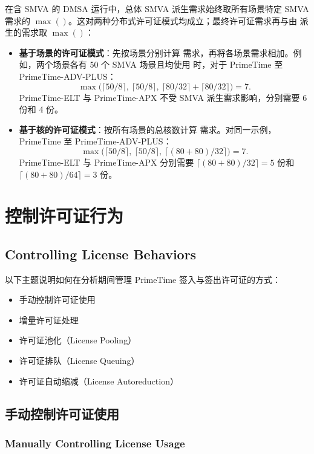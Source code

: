 在含 SMVA 的 DMSA 运行中，总体 SMVA 派生需求始终取所有场景特定
SMVA 需求的 $\max()$。这对两种分布式许可证模式均成立；最终许可证需求再与由  派生的需求取 $\max()$：
\begin{itemize}
  \item \textbf{基于场景的许可证模式}：先按场景分别计算
   需求，再将各场景需求相加。例如，两个场景各有
  50 个 SMVA 场景且均使用  时，对于 PrimeTime 至
  PrimeTime-ADV-PLUS：
  \[
    \max\bigl(\lceil 50/8\rceil,\ \lceil 50/8\rceil,\
    \lceil 80/32\rceil+\lceil 80/32\rceil\bigr)=7.
  \]
  PrimeTime-ELT 与 PrimeTime-APX 不受 SMVA 派生需求影响，分别需要 6 份和 4 份。
  \item \textbf{基于核的许可证模式}：按所有场景的总核数计算
   需求。对同一示例，PrimeTime 至 PrimeTime-ADV-PLUS：
  \[
    \max\bigl(\lceil 50/8\rceil,\ \lceil 50/8\rceil,\
    \lceil(80+80)/32\rceil\bigr)=7.
  \]
  PrimeTime-ELT 与 PrimeTime-APX 分别需要
  $\lceil(80+80)/32\rceil=5$ 份和
  $\lceil(80+80)/64\rceil=3$ 份。
\end{itemize}

\section{控制许可证行为}
\subsection*{Controlling License Behaviors}

以下主题说明如何在分析期间管理 PrimeTime 签入与签出许可证的方式：
\begin{itemize}
  \item 手动控制许可证使用
  \item 增量许可证处理
  \item 许可证池化（License Pooling）
  \item 许可证排队（License Queuing）
  \item 许可证自动缩减（License Autoreduction）
\end{itemize}

\subsection{手动控制许可证使用}
\subsubsection*{Manually Controlling License Usage}

